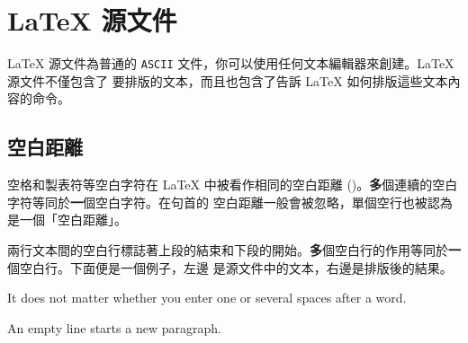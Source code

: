 \section{\LaTeX{} 源文件}


\LaTeX{} 源文件為普通的 \texttt{ASCII} 文件，你可以使用任何文本編輯器來創建。\LaTeX{} 源文件不僅包含了
要排版的文本，而且也包含了告訴 \LaTeX{} 如何排版這些文本內容的命令。

\subsection{空白距離}


空格和製表符等空白字符在 \LaTeX{} 中被看作相同的空白距離 ()。{\textbf
多}個連續的空白字符等同於\textbf{一}個空白字符。在句首的
空白距離一般會被忽略，單個空行也被認為是一個「空白距離」。



兩行文本間的空白行標誌著上段的結束和下段的開始。{\textbf
多}個空白行的作用等同於\textbf{一}個空白行。下面便是一個例子，左邊
是源文件中的文本，右邊是排版後的結果。

\begin{example}
It does not matter whether you
enter one or several     spaces
after a word.

An empty line starts a new
paragraph.
\end{example}


